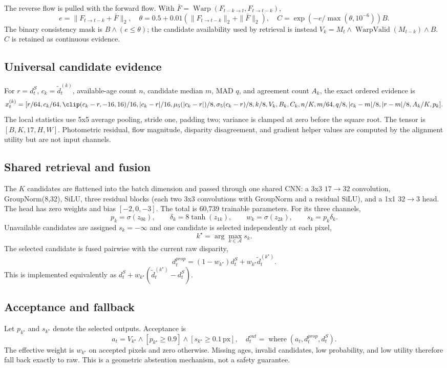 The reverse flow is pulled with the forward flow. With $\bar F=\operatorname{Warp}(F_{t-k\rightarrow t},F_{t\rightarrow t-k})$,
\[
e=\|F_{t\rightarrow t-k}+\bar F\|_2,\quad
\theta=0.5+0.01(\|F_{t\rightarrow t-k}\|_2+\|\bar F\|_2),\quad
C=\exp(-e/\max(\theta,10^{-6}))B.
\]
The binary consistency mask is $B\land(e\le\theta)$; the candidate availability used by retrieval is instead $V_k=M_t\land\operatorname{WarpValid}(M_{t-k})\land B$. $C$ is retained as continuous evidence.

\subsection{Universal candidate evidence}
For $r=d_t^S$, $c_k=\widetilde d_t^{(k)}$, available-age count $n$, candidate median $m$, MAD $q$, and agreement count $A_k$, the exact ordered evidence is
\[
x_t^{(k)}=[r/64,c_k/64,\clip(c_k-r,-16,16)/16,|c_k-r|/16,
\mu_5(|c_k-r|)/8,\sigma_5(c_k-r)/8,k/8,V_k,B_k,C_k,n/K,m/64,q/8,|c_k-m|/8,|r-m|/8,A_k/K,p_k].
\]
The local statistics use 5x5 average pooling, stride one, padding two; variance is clamped at zero before the square root. The tensor is $[B,K,17,H,W]$. Photometric residual, flow magnitude, disparity disagreement, and gradient helper values are computed by the alignment utility but are not input channels.

\subsection{Shared retrieval and fusion}
The $K$ candidates are flattened into the batch dimension and passed through one shared CNN: a 3x3 $17\to32$ convolution, GroupNorm(8,32), SiLU, three residual blocks (each two 3x3 convolutions with GroupNorm and a residual SiLU), and a 1x1 $32\to3$ head. The head has zero weights and bias $[-2,0,-3]$. The total is 60,739 trainable parameters. For its three channels,
\[
p_k=\sigma(z_{0k}),\qquad\delta_k=8\tanh(z_{1k}),\qquad w_k=\sigma(z_{2k}),\qquad s_k=p_k\delta_k.
\]
Unavailable candidates are assigned $s_k=-\infty$ and one candidate is selected independently at each pixel,
\[
k^\star=\arg\max_{k\in\mathcal A}s_k.
\]
The selected candidate is fused pairwise with the current raw disparity,
\[
d_t^{prop}=(1-w_{k^\star})d_t^S+w_{k^\star}\widetilde d_t^{(k^\star)}.
\]
This is implemented equivalently as $d_t^S+w_{k^\star}(\widetilde d_t^{(k^\star)}-d_t^S)$.

\subsection{Acceptance and fallback}
Let $p_{k^\star}$ and $s_{k^\star}$ denote the selected outputs. Acceptance is
\[
a_t=V_{k^\star}\land[p_{k^\star}\ge0.9]\land[s_{k^\star}\ge0.1\,\mathrm{px}],
\quad d_t^{out}=\operatorname{where}(a_t,d_t^{prop},d_t^S).
\]
The effective weight is $w_{k^\star}$ on accepted pixels and zero otherwise. Missing ages, invalid candidates, low probability, and low utility therefore fall back exactly to raw. This is a geometric abstention mechanism, not a safety guarantee.

